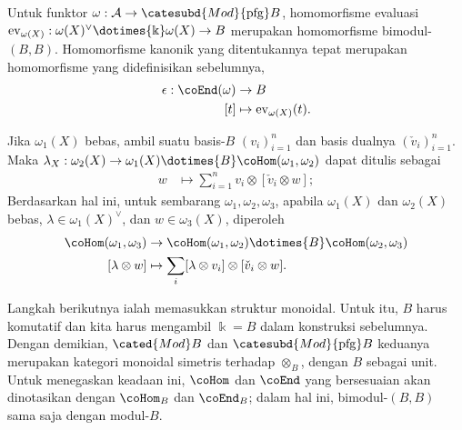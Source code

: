 Untuk funktor $\omega: \mathcal{A} \to \catesubd{Mod}{\mathrm{pfg}}B$, homomorfisme evaluasi $\mathrm{ev}_{\omega(X)}: \omega(X)^\vee \dotimes{\Bbbk} \omega(X) \to B$ merupakan homomorfisme bimodul-$(B, B)$. Homomorfisme kanonik yang ditentukannya tepat merupakan homomorfisme yang didefinisikan sebelumnya,
\begin{equation}\label{eqn:L-counit}
	\begin{aligned}
		\epsilon: \coEnd(\omega) & \to B \\
		[t] & \mapsto \mathrm{ev}_{\omega(X)}(t).
	\end{aligned}
\end{equation}

Jika $\omega_1(X)$ bebas, ambil suatu basis-$B$ $(v_i)_{i=1}^n$ dan basis dualnya $(\check{v}_i)_{i=1}^n$. Maka $\lambda_X: \omega_2(X) \to \omega_1(X) \dotimes{B} \coHom(\omega_1, \omega_2)$ dapat ditulis sebagai
\begin{equation}\label{eqn:L-coaction}\begin{aligned}
	w & \mapsto \sum_{i=1}^n v_i \otimes [\check{v}_i \otimes w];
\end{aligned}\end{equation}
Berdasarkan hal ini, untuk sembarang $\omega_1, \omega_2, \omega_3$, apabila $\omega_1(X)$ dan $\omega_2(X)$ bebas, $\lambda \in \omega_1(X)^\vee$, dan $w \in \omega_3(X)$, diperoleh
\begin{equation}\label{eqn:L-comult}\begin{aligned}
	\coHom(\omega_1, \omega_3) & \to \coHom(\omega_1, \omega_2) \dotimes{B} \coHom(\omega_2, \omega_3) \\
	[\lambda \otimes w] & \mapsto \sum_i [\lambda \otimes v_i] \otimes [\check{v}_i \otimes w].
\end{aligned}\end{equation}

Langkah berikutnya ialah memasukkan struktur monoidal. Untuk itu, $B$ harus komutatif dan kita harus mengambil $\Bbbk = B$ dalam konstruksi sebelumnya. Dengan demikian, $\cated{Mod}B$ dan $\catesubd{Mod}{\mathrm{pfg}}B$ keduanya merupakan kategori monoidal simetris terhadap $\otimes_B$, dengan $B$ sebagai unit. Untuk menegaskan keadaan ini, $\coHom$ dan $\coEnd$ yang bersesuaian akan dinotasikan dengan $\coHom_B$ dan $\coEnd_B$; dalam hal ini, bimodul-$(B, B)$ sama saja dengan modul-$B$.

